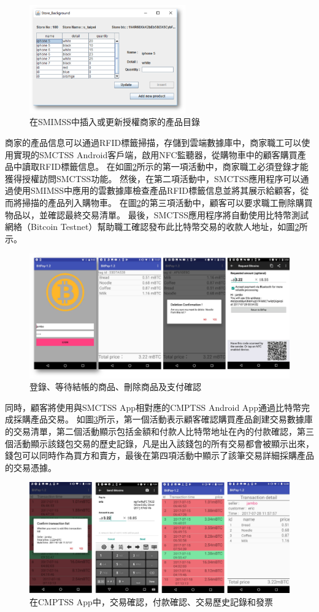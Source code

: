 \begin{figure}[!htbp]
	\centering
	\includegraphics[width = 0.6\textwidth]{fig6.png}
	\caption{在SMIMSS中插入或更新授權商家的產品目錄}\label{fig6}
\end{figure}

商家的產品信息可以通過RFID標籤掃描，存儲到雲端數據庫中，商家職工可以使用實現的SMCTSS Android客戶端，啟用NFC監聽器，從購物車中的顧客購買產品中讀取RFID標籤信息。 在如圖\ref{fig7}所示的第一項活動中，商家職工必須登錄才能獲得授權訪問SMCTSS功能。 然後，在第二項活動中，SMCTSS應用程序可以通過使用SMIMSS中應用的雲數據庫檢查產品RFID標籤信息並將其展示給顧客，從而將掃描的產品列入購物車。 在圖\ref{fig7}的第三項活動中，顧客可以要求職工刪除購買物品以，並確認最終交易清單。 最後，SMCTSS應用程序將自動使用比特幣測試網絡（Bitcoin Testnet）\supercite{bitcointestnet}幫助職工確認發布此比特幣交易的收款人地址，如圖\ref{fig7}所示。    

\begin{figure}[!htbp]
	\centering
	\includegraphics[width = 1\textwidth]{fig7.png}
	\caption{登錄、等待結帳的商品、刪除商品及支付確認}\label{fig7}
\end{figure}

同時，顧客將使用與SMCTSS App相對應的CMPTSS Android App通過比特幣完成採購產品交易。 如圖\ref{fig8}所示，第一個活動表示顧客確認購買產品創建交易數據庫的交易清單，第二個活動顯示包括金額和付款人比特幣地址在內的付款確認，第三個活動顯⽰該錢包交易的歷史記錄，凡是出入該錢包的所有交易都會被顯示出來，
錢包可以同時作為買⽅和賣⽅，最後在第四項活動中顯示了該筆交易詳細採購產品的交易憑據。    

\begin{figure}[!htbp]
	\centering
	\includegraphics[width = 1\textwidth]{fig8.png}
	\caption{在CMPTSS App中，交易確認，付款確認、交易歷史記錄和發票}\label{fig8}
\end{figure}